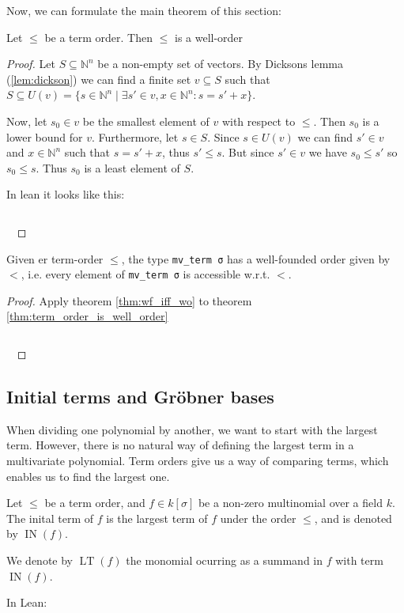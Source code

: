 \documentclass[a4paper, 12pt]{article}
\newcommand{\N}{\mathbb{N}}
\DeclareMathOperator{\IN}{IN}
\DeclareMathOperator{\LT}{LT}
\newcommand{\lean}[1]{\texttt{#1}}
\theoremstyle{changedot}
\theoremstyle{changedotbreak}
\theoremstyle{nonumberplain}
\newtheorem{proof}{Proof}
\begin{document}
Now, we can formulate the main theorem of this section:

\begin{theorem}\label{thm:term_order_is_well_order}
  Let $\le$ be a term order. Then $\le$ is a well-order
\end{theorem}
\begin{proof}
  Let $S \subseteq \N^{n}$ be a non-empty set of vectors. By Dicksons lemma (\ref{lem:dickson}) we can find a finite set $v \subseteq S$ such that $S \subseteq U(v) = \{s \in \N^{n} \mid \exists s' \in v, x \in \N^{n} : s = s' + x\}$.

  Now, let $s_{0} \in v$ be the smallest element of $v$ with respect to $\le$. Then $s_{0}$ is a lower bound for $v$. Furthermore, let $s \in S$. Since $s \in U(v)$ we can find $s' \in v$ and $x \in \N^{n}$ such that $s = s' + x$, thus $s' \le s$. But since $s' \in v$ we have $s_{0} \le s'$ so $s_{0} \le s$. Thus $s_{0}$ is a least element of $S$.

  In lean it looks like this:

  \inputminted[firstline=70, lastline=94]{lean}{../src/monomial_order.lean}
  ~
\end{proof}

\begin{corollary}
  Given er term-order $\le$, the type \lean{mv_term σ} has a well-founded order given by $<$, i.e. every element of \lean{mv_term σ} is accessible w.r.t. $<$.
\end{corollary}
\begin{proof}
  Apply theorem \ref{thm:wf_iff_wo} to theorem \ref{thm:term_order_is_well_order}

  \inputminted[firstline=96, lastline=103]{lean}{../src/monomial_order.lean}
  ~
\end{proof}



\subsection{Initial terms and Gröbner bases}

When dividing one polynomial by another, we want to start with the largest term. However, there is no natural way of defining the largest term in a multivariate polynomial. Term orders give us a way of comparing terms, which enables us to find the largest one.

\begin{definition}
  Let $\le$ be a term order, and $f \in k[\sigma]$ be a non-zero multinomial over a field $k$. The inital term of $f$ is the largest term of $f$ under the order $\le$, and is denoted by $\IN(f)$.

  We denote by $\LT(f)$ the monomial ocurring as a summand in $f$ with term $\IN(f)$.

  In Lean:
  \inputminted[firstline=21, lastline=25]{lean}{../src/initial_term.lean}
\end{definition}
\end{document}
